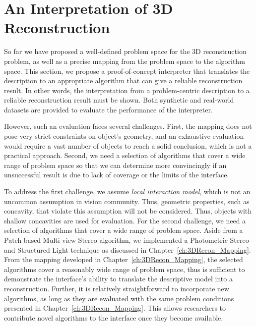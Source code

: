 
\chapter{An Interpretation of 3D Reconstruction}
\label{ch:3DRecon_Interp}
So far we have proposed a well-defined problem space for the 3D reconstruction problem, as well as a precise mapping from the problem space to the algorithm space. This section, we propose a proof-of-concept interpreter that translates the description to an appropriate algorithm that can give a reliable reconstruction result. In other words, the interpretation from a problem-centric description to a reliable reconstruction result must be shown. Both synthetic and real-world datasets are provided to evaluate the performance of the interpreter.

However, such an evaluation faces several challenges. First, the mapping does not pose very strict constraints on object's geometry, and an exhaustive evaluation would require a vast number of objects to reach a solid conclusion, which is not a practical approach. Second, we need a selection of algorithms that cover a wide range of problem space so that we can determine more convincingly if an unsuccessful result is due to lack of coverage or the limits of the interface.

To address the first challenge, we assume \textit{local interaction model}, which is not an uncommon assumption in vision community. Thus, geometric properties, such as concavity, that violate this assumption will not be considered. Thus, objects with shallow concavities are used for evaluation. For the second challenge, we need a selection of algorithms that cover a wide range of problem space. Aside from a Patch-based Multi-view Stereo algorithm, we implemented a Photometric Stereo and Structured Light technique as discussed in Chapter~\ref{ch:3DRecon_Mapping}. From the mapping developed in Chapter~\ref{ch:3DRecon_Mapping}, the selected algorithms cover a reasonably wide range of problem space, thus is sufficient to demonstrate the interface's ability to translate the descriptive model into a reconstruction. Further, it is relatively straightforward to incorporate new algorithms, as long as they are evaluated with the same problem conditions presented in Chapter~\ref{ch:3DRecon_Mapping}. This allows researchers to contribute novel algorithms to the interface once they become available.

